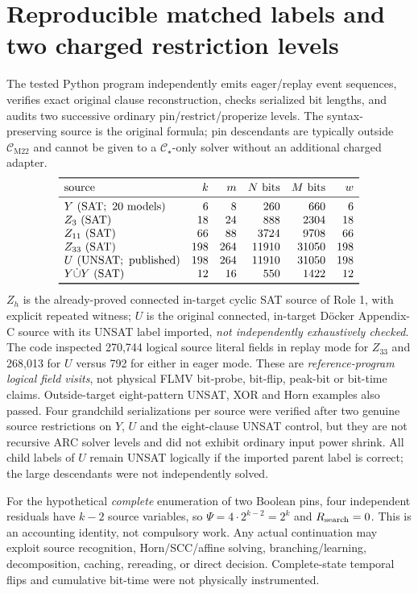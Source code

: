 \documentclass[11pt]{article}
\newcommand{\CM}{\mathcal C_{\mathrm{M22}}}
\newcommand{\CS}{\mathcal C_\star}
\newcommand{\SAT}{\operatorname{SAT}}
\begin{document}
\section{Reproducible matched labels and two charged restriction levels}
The tested Python program independently emits eager/replay event sequences, verifies exact original clause reconstruction, checks serialized bit lengths, and audits two successive ordinary pin/restrict/properize levels. The syntax-preserving source is the original formula; pin descendants are typically outside $\CM$ and cannot be given to a $\CS$-only solver without an additional charged adapter.
\[
\begin{array}{lrrrrr}
\toprule
\text{source}&k&m&N\text{ bits}&M\text{ bits}&w\\\midrule
Y\ (\SAT;\ 20\text{ models})&6&8&260&660&6\\
Z_3\ (\SAT)&18&24&888&2304&18\\
Z_{11}\ (\SAT)&66&88&3724&9708&66\\
Z_{33}\ (\SAT)&198&264&11910&31050&198\\
U\ (\mathrm{UNSAT;\ published})&198&264&11910&31050&198\\
Y\dot\cup Y\ (\SAT)&12&16&550&1422&12\\\bottomrule
\end{array}
\]
$Z_h$ is the already-proved connected in-target cyclic SAT source of Role 1, with explicit repeated witness; $U$ is the original connected, in-target D\"ocker Appendix-C source with its UNSAT label imported, \emph{not independently exhaustively checked}. The code inspected 270,744 logical source literal fields in replay mode for $Z_{33}$ and 268,013 for $U$ versus 792 for either in eager mode. These are \emph{reference-program logical field visits}, not physical FLMV bit-probe, bit-flip, peak-bit or bit-time claims. Outside-target eight-pattern UNSAT, XOR and Horn examples also passed. Four grandchild serializations per source were verified after two genuine source restrictions on $Y$, $U$ and the eight-clause UNSAT control, but they are not recursive ARC solver levels and did not exhibit ordinary input power shrink. All child labels of $U$ remain UNSAT logically if the imported parent label is correct; the large descendants were not independently solved.

For the hypothetical \emph{complete} enumeration of two Boolean pins, four independent residuals have $k-2$ source variables, so $\Psi=4\cdot2^{k-2}=2^k$ and $R_{\rm search}=0$. This is an accounting identity, not compulsory work. Any actual continuation may exploit source recognition, Horn/SCC/affine solving, branching/learning, decomposition, caching, rereading, or direct decision. Complete-state temporal flips and cumulative bit-time were not physically instrumented.
\end{document}
